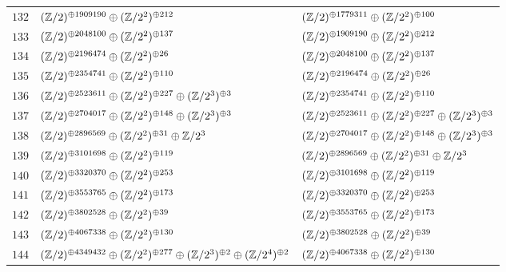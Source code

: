 \begin{supertabular}{|c|p{5.5cm}|p{5.5cm}|}
$132$%
&$(\mathbb{Z}/2)^{\oplus1909190}\oplus(\mathbb{Z}/2^{2})^{\oplus212}$%
&$(\mathbb{Z}/2)^{\oplus1779311}\oplus(\mathbb{Z}/2^{2})^{\oplus100}$\\

$133$%
&$(\mathbb{Z}/2)^{\oplus2048100}\oplus(\mathbb{Z}/2^{2})^{\oplus137}$%
&$(\mathbb{Z}/2)^{\oplus1909190}\oplus(\mathbb{Z}/2^{2})^{\oplus212}$\\

$134$%
&$(\mathbb{Z}/2)^{\oplus2196474}\oplus(\mathbb{Z}/2^{2})^{\oplus26}$%
&$(\mathbb{Z}/2)^{\oplus2048100}\oplus(\mathbb{Z}/2^{2})^{\oplus137}$\\

$135$%
&$(\mathbb{Z}/2)^{\oplus2354741}\oplus(\mathbb{Z}/2^{2})^{\oplus110}$%
&$(\mathbb{Z}/2)^{\oplus2196474}\oplus(\mathbb{Z}/2^{2})^{\oplus26}$\\

$136$%
&$(\mathbb{Z}/2)^{\oplus2523611}\oplus(\mathbb{Z}/2^{2})^{\oplus227}\oplus(\mathbb{Z}/2^{3})^{\oplus3}$%
&$(\mathbb{Z}/2)^{\oplus2354741}\oplus(\mathbb{Z}/2^{2})^{\oplus110}$\\

$137$%
&$(\mathbb{Z}/2)^{\oplus2704017}\oplus(\mathbb{Z}/2^{2})^{\oplus148}\oplus(\mathbb{Z}/2^{3})^{\oplus3}$%
&$(\mathbb{Z}/2)^{\oplus2523611}\oplus(\mathbb{Z}/2^{2})^{\oplus227}\oplus(\mathbb{Z}/2^{3})^{\oplus3}$\\

$138$%
&$(\mathbb{Z}/2)^{\oplus2896569}\oplus(\mathbb{Z}/2^{2})^{\oplus31}\oplus\mathbb{Z}/2^{3}$%
&$(\mathbb{Z}/2)^{\oplus2704017}\oplus(\mathbb{Z}/2^{2})^{\oplus148}\oplus(\mathbb{Z}/2^{3})^{\oplus3}$\\

$139$%
&$(\mathbb{Z}/2)^{\oplus3101698}\oplus(\mathbb{Z}/2^{2})^{\oplus119}$%
&$(\mathbb{Z}/2)^{\oplus2896569}\oplus(\mathbb{Z}/2^{2})^{\oplus31}\oplus\mathbb{Z}/2^{3}$\\

$140$%
&$(\mathbb{Z}/2)^{\oplus3320370}\oplus(\mathbb{Z}/2^{2})^{\oplus253}$%
&$(\mathbb{Z}/2)^{\oplus3101698}\oplus(\mathbb{Z}/2^{2})^{\oplus119}$\\

$141$%
&$(\mathbb{Z}/2)^{\oplus3553765}\oplus(\mathbb{Z}/2^{2})^{\oplus173}$%
&$(\mathbb{Z}/2)^{\oplus3320370}\oplus(\mathbb{Z}/2^{2})^{\oplus253}$\\

$142$%
&$(\mathbb{Z}/2)^{\oplus3802528}\oplus(\mathbb{Z}/2^{2})^{\oplus39}$%
&$(\mathbb{Z}/2)^{\oplus3553765}\oplus(\mathbb{Z}/2^{2})^{\oplus173}$\\

$143$%
&$(\mathbb{Z}/2)^{\oplus4067338}\oplus(\mathbb{Z}/2^{2})^{\oplus130}$%
&$(\mathbb{Z}/2)^{\oplus3802528}\oplus(\mathbb{Z}/2^{2})^{\oplus39}$\\

$144$%
&$(\mathbb{Z}/2)^{\oplus4349432}\oplus(\mathbb{Z}/2^{2})^{\oplus277}\oplus(\mathbb{Z}/2^{3})^{\oplus2}\oplus(\mathbb{Z}/2^{4})^{\oplus2}$%
&$(\mathbb{Z}/2)^{\oplus4067338}\oplus(\mathbb{Z}/2^{2})^{\oplus130}$\\


\end{supertabular}
